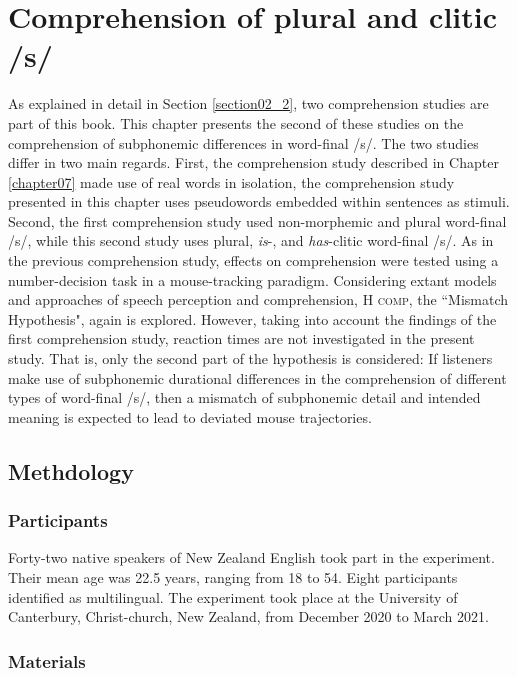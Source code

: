 \chapter{Comprehension of plural and clitic /s/}\label{chapter08}

As explained in detail in Section \ref{section02_2}, two comprehension studies are part of this book. This chapter presents the second of these studies on the comprehension of subphonemic differences in word-final /s/. The two studies differ in two main regards. First, the comprehension study described in Chapter \ref{chapter07} made use of real words in isolation, the comprehension study presented in this chapter uses pseudowords embedded within sentences as stimuli. Second, the first comprehension study used non-morphemic and plural word-final /s/, while this second study uses plural, \textit{is}-, and \textit{has}-clitic word-final /s/. As in the previous comprehension study, effects on comprehension were tested using a number-decision task in a mouse-tracking paradigm. Considering extant models and approaches of speech perception and comprehension, \textsc{H comp}, the ``Mismatch Hypothesis", again is explored. However, taking into account the findings of the first comprehension study, reaction times are not investigated in the present study. That is, only the second part of the hypothesis is considered: If listeners make use of subphonemic durational differences in the comprehension of different types of word-final /s/, then a mismatch of subphonemic detail and intended meaning is expected to lead to deviated mouse trajectories.

\section{Methdology}\label{section08_1}

\subsection{Participants}\label{section08_1_1}

Forty-two native speakers of New Zealand English took part in the experiment. Their mean age was 22.5 years, ranging from 18 to 54. Eight participants identified as multilingual. The experiment took place at the University of Canterbury, Christ-church, New Zealand, from December 2020 to March 2021.

\subsection{Materials}\label{section08_1_2}

